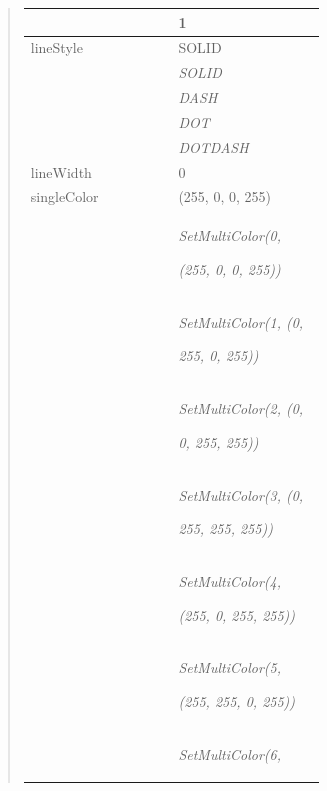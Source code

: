 \documentclass[letterpaper,10pt,english]{sphinxmanual}
\begin{document}
\begin{quote}
\begin{longtable}{|p{0.475\linewidth}|p{0.475\linewidth}|}
 & 
1
\\
\hline
lineStyle
 & 
SOLID
\\
\hline & 
\emph{SOLID}
\\
\hline & 
\emph{DASH}
\\
\hline & 
\emph{DOT}
\\
\hline & 
\emph{DOTDASH}
\\
\hline
lineWidth
 & 
0
\\
\hline
singleColor
 & 
(255, 0, 0, 255)
\\
\hline & 
\begin{DUlineblock}{0em}
\item[] \emph{SetMultiColor(0,}
\item[] \emph{(255, 0, 0, 255))}
\end{DUlineblock}
\\
\hline & 
\begin{DUlineblock}{0em}
\item[] \emph{SetMultiColor(1, (0,}
\item[] \emph{255, 0, 255))}
\end{DUlineblock}
\\
\hline & 
\begin{DUlineblock}{0em}
\item[] \emph{SetMultiColor(2, (0,}
\item[] \emph{0, 255, 255))}
\end{DUlineblock}
\\
\hline & 
\begin{DUlineblock}{0em}
\item[] \emph{SetMultiColor(3, (0,}
\item[] \emph{255, 255, 255))}
\end{DUlineblock}
\\
\hline & 
\begin{DUlineblock}{0em}
\item[] \emph{SetMultiColor(4,}
\item[] \emph{(255, 0, 255, 255))}
\end{DUlineblock}
\\
\hline & 
\begin{DUlineblock}{0em}
\item[] \emph{SetMultiColor(5,}
\item[] \emph{(255, 255, 0, 255))}
\end{DUlineblock}
\\
\hline & 
\begin{DUlineblock}{0em}
\item[] \emph{SetMultiColor(6,}

\end{DUlineblock}
\end{longtable}
\end{quote}
\end{document}

